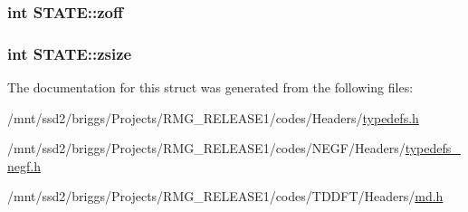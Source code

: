 \hypertarget{struct_s_t_a_t_e_aea36542d4f54ef8f1d79129cb9c7e5b9}{
\subsubsection[{zoff}]{\setlength{\rightskip}{0pt plus 5cm}int S\-T\-A\-T\-E\-::zoff}}\label{struct_s_t_a_t_e_aea36542d4f54ef8f1d79129cb9c7e5b9}
\hypertarget{struct_s_t_a_t_e_a31ecde2a6f98a2668566cca79c91217f}{
\subsubsection[{zsize}]{\setlength{\rightskip}{0pt plus 5cm}int S\-T\-A\-T\-E\-::zsize}}\label{struct_s_t_a_t_e_a31ecde2a6f98a2668566cca79c91217f}


The documentation for this struct was generated from the following files\-:\begin{DoxyCompactItemize}
\item 
/mnt/ssd2/briggs/\-Projects/\-R\-M\-G\-\_\-\-R\-E\-L\-E\-A\-S\-E1/codes/\-Headers/\hyperlink{_headers_2typedefs_8h}{typedefs.\-h}\item 
/mnt/ssd2/briggs/\-Projects/\-R\-M\-G\-\_\-\-R\-E\-L\-E\-A\-S\-E1/codes/\-N\-E\-G\-F/\-Headers/\hyperlink{typedefs__negf_8h}{typedefs\-\_\-negf.\-h}\item 
/mnt/ssd2/briggs/\-Projects/\-R\-M\-G\-\_\-\-R\-E\-L\-E\-A\-S\-E1/codes/\-T\-D\-D\-F\-T/\-Headers/\hyperlink{md_8h}{md.\-h}\end{DoxyCompactItemize}
